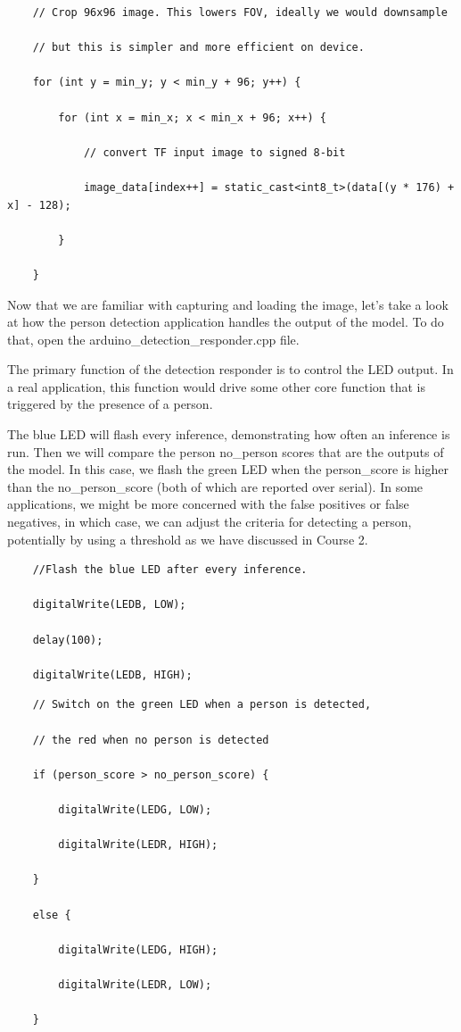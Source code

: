   \begin{lstlisting}
    // Crop 96x96 image. This lowers FOV, ideally we would downsample
    
    // but this is simpler and more efficient on device.
    
    for (int y = min_y; y < min_y + 96; y++) {
        
        for (int x = min_x; x < min_x + 96; x++) {
            
            // convert TF input image to signed 8-bit
            
            image_data[index++] = static_cast<int8_t>(data[(y * 176) + x] - 128);
            
        }
        
    }
  \end{lstlisting}    
    
    Now that we are familiar with capturing and loading the image, let’s take a look at how the person detection application handles the output of the model. To do that, open the arduino\_detection\_responder.cpp file.
    
    The primary function of the detection responder is to control the LED output. In a real application, this function would drive some other core function that is triggered by the presence of a person.
    
    The blue LED will flash every inference, demonstrating how often an inference is run. Then we will compare the person no\_person scores that are the outputs of the model. In this case, we flash the green LED when the person\_score is higher than the no\_person\_score (both of which are reported over serial). In some applications, we might be more concerned with the false positives or false negatives, in which case, we can adjust the criteria for detecting a person, potentially by using a threshold as we have discussed in Course 2.
    
  \begin{lstlisting}
    //Flash the blue LED after every inference.
    
    digitalWrite(LEDB, LOW);
    
    delay(100);
    
    digitalWrite(LEDB, HIGH);
  \end{lstlisting}    
    
  \begin{lstlisting}
    // Switch on the green LED when a person is detected,
    
    // the red when no person is detected
    
    if (person_score > no_person_score) {
        
        digitalWrite(LEDG, LOW);
        
        digitalWrite(LEDR, HIGH);
        
    }
    
    else {
        
        digitalWrite(LEDG, HIGH);
        
        digitalWrite(LEDR, LOW);
        
    }
  \end{lstlisting}    
    
